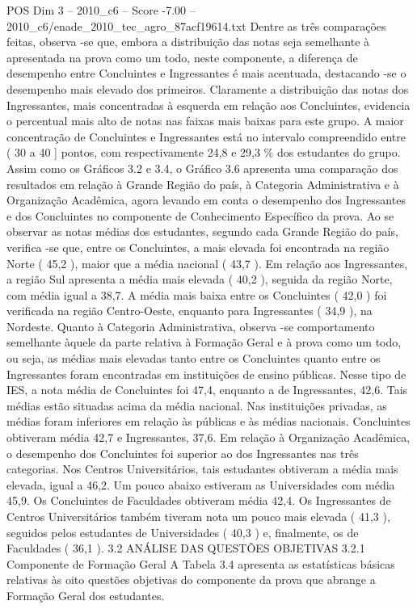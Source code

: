 \begin{textsample}{POS Dim 3 – 2010\_c6 – Score -7.00 – 2010\_c6/enade\_2010\_tec\_agro\_87acf19614.txt}
Dentre as três comparações feitas, observa -se que, embora a distribuição das notas seja semelhante à apresentada na prova como um todo, neste componente, a diferença de desempenho entre Concluintes e Ingressantes é mais acentuada, destacando -se o desempenho mais elevado dos primeiros.
Claramente a distribuição das notas dos Ingressantes, mais concentradas à esquerda em relação aos Concluintes, evidencia o percentual mais alto de notas nas faixas mais baixas para este grupo.
A maior concentração de Concluintes e Ingressantes está no intervalo compreendido entre ( 30 a 40 ] pontos, com respectivamente 24,8 e 29,3 \% dos estudantes do grupo.
Assim como os Gráficos 3.2 e 3.4, o Gráfico 3.6 apresenta uma comparação dos resultados em relação à Grande Região do país, à Categoria Administrativa e à Organização Acadêmica, agora levando em conta o desempenho dos Ingressantes e dos Concluintes no componente de Conhecimento Específico da prova.
Ao se observar as notas médias dos estudantes, segundo cada Grande Região do país, verifica -se que, entre os Concluintes, a mais elevada foi encontrada na região Norte ( 45,2 ), maior que a média nacional ( 43,7 ).
Em relação aos Ingressantes, a região Sul apresenta a média mais elevada ( 40,2 ), seguida da região Norte, com média igual a 38,7.
A média mais baixa entre os Concluintes ( 42,0 ) foi verificada na região Centro-Oeste, enquanto para Ingressantes ( 34,9 ), na Nordeste.
Quanto à Categoria Administrativa, observa -se comportamento semelhante àquele da parte relativa à Formação Geral e à prova como um todo, ou seja, as médias mais elevadas tanto entre os Concluintes quanto entre os Ingressantes foram encontradas em instituições de ensino públicas.
Nesse tipo de IES, a nota média de Concluintes foi 47,4, enquanto a de Ingressantes, 42,6.
Tais médias estão situadas acima da média nacional.
Nas instituições privadas, as médias foram inferiores em relação às públicas e às médias nacionais.
Concluintes obtiveram média 42,7 e Ingressantes, 37,6.
Em relação à Organização Acadêmica, o desempenho dos Concluintes foi superior ao dos Ingressantes nas três categorias.
Nos Centros Universitários, tais estudantes obtiveram a média mais elevada, igual a 46,2.
Um pouco abaixo estiveram as Universidades com média 45,9.
Os Concluintes de Faculdades obtiveram média 42,4.
Os Ingressantes de Centros Universitários também tiveram nota um pouco mais elevada ( 41,3 ), seguidos pelos estudantes de Universidades ( 40,3 ) e, finalmente, os de Faculdades ( 36,1 ). 3.2 ANÁLISE DAS QUESTÕES OBJETIVAS 3.2.1 Componente de Formação Geral A Tabela 3.4 apresenta as estatísticas básicas relativas às oito questões objetivas do componente da prova que abrange a Formação Geral dos estudantes.

\end{textsample}
